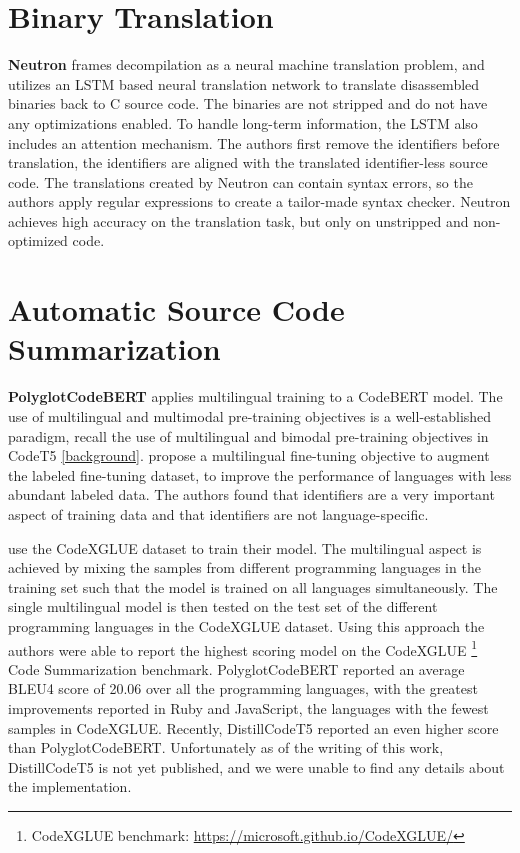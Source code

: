 \section{Binary Translation}
\textbf{Neutron} \cite{Neutron} frames decompilation as a neural machine translation problem, and utilizes an LSTM based neural translation network to translate disassembled binaries back to C source code. The binaries are not stripped and do not have any optimizations enabled. To handle long-term information, the LSTM also includes an attention mechanism. The authors first remove the identifiers before translation, the identifiers are aligned with the translated identifier-less source code. The translations created by Neutron can contain syntax errors, so the authors apply regular expressions to create a tailor-made syntax checker. Neutron achieves high accuracy on the translation task, but only on unstripped and non-optimized code.

\section{Automatic Source Code Summarization}
\textbf{PolyglotCodeBERT} \cite{PolyglotCodeBERT} applies multilingual training to a CodeBERT \cite{CodeBERT} model. The use of multilingual and multimodal pre-training objectives is a  well-established paradigm, recall the use of multilingual and bimodal pre-training objectives in CodeT5 \cite{CodeT5} \ref{background}. \citeauthor{PolyglotCodeBERT} propose a multilingual fine-tuning objective to augment the labeled fine-tuning dataset, to improve the performance of languages with less abundant labeled data. The authors found that identifiers are a very important aspect of training data and that identifiers are not language-specific. 

\citeauthor{PolyglotCodeBERT} use the CodeXGLUE dataset to train their model. The multilingual aspect is achieved by mixing the samples from different programming languages in the training set such that the model is trained on all languages simultaneously. The single multilingual model is then tested on the test set of the different programming languages in the CodeXGLUE dataset. Using this approach the authors were able to report the highest scoring model on the CodeXGLUE \cite{CodeXGlue} \footnote{CodeXGLUE benchmark: \url{https://microsoft.github.io/CodeXGLUE/}} Code Summarization benchmark. PolyglotCodeBERT reported an average BLEU4 score of 20.06 over all the programming languages, with the greatest improvements reported in Ruby and JavaScript, the languages with the fewest samples in CodeXGLUE. Recently, DistillCodeT5 reported an even higher score than PolyglotCodeBERT. Unfortunately as of the writing of this work, DistillCodeT5 is not yet published, and we were unable to find any details about the implementation.

